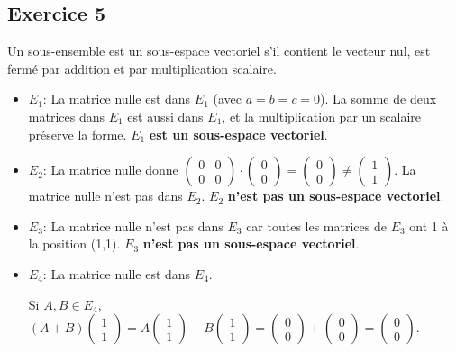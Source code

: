 \documentclass[french]{yLectureNote}
\begin{document}
\subsection{Exercice 5}
Un sous-ensemble est un sous-espace vectoriel s'il contient le vecteur nul, est fermé par addition et par multiplication scalaire.
\begin{itemize}
    \item $E_1$: La matrice nulle est dans $E_1$ (avec $a=b=c=0$). La somme de deux matrices dans $E_1$ est aussi dans $E_1$, et la multiplication par un scalaire préserve la forme. $E_1$ \textbf{est un sous-espace vectoriel}.
    \item $E_2$: La matrice nulle donne $\begin{pmatrix} 0 & 0 \\ 0 & 0 \end{pmatrix}\cdot\begin{pmatrix} 0 \\ 0 \end{pmatrix}=\begin{pmatrix} 0 \\ 0 \end{pmatrix}\ne\begin{pmatrix} 1 \\ 1 \end{pmatrix}$. La matrice nulle n'est pas dans $E_2$. $E_2$ \textbf{n'est pas un sous-espace vectoriel}.
    \item $E_3$: La matrice nulle n'est pas dans $E_3$ car toutes les matrices de $E_3$ ont 1 à la position (1,1). $E_3$ \textbf{n'est pas un sous-espace vectoriel}.
    \item $E_4$: La matrice nulle est dans $E_4$.

    Si $A,B\in E_4$, $(A+B)\begin{pmatrix}1\\1\end{pmatrix} = A\begin{pmatrix}1\\1\end{pmatrix}+B\begin{pmatrix}1\\1\end{pmatrix}=\begin{pmatrix}0\\0\end{pmatrix}+\begin{pmatrix}0\\0\end{pmatrix}=\begin{pmatrix}0\\0\end{pmatrix}$.


\end{itemize}
\end{document}
